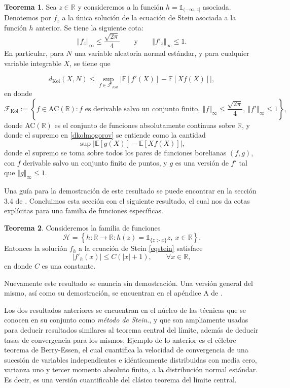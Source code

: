 \documentclass[letterpaper,twoside,12pt]{book}
\newcommand{\R}{\mathbb{R}}
\newcommand{\F}{\mathcal{F}}
\newcommand{\E}{\mathbb{E}}
\newcommand{\1}{\mathds{1}}
\newcommand{\abs}[1]{\left\lvert #1 \right\rvert}
\renewcommand{\to}{\rightarrow}
\newcommand{\norm}[1]{\left\Vert #1 \right\Vert}
\theoremstyle{definition}
\theoremstyle{definition}
\newtheorem{teo}{Teorema}
\theoremstyle{remark}
\theoremstyle{definition}
\theoremstyle{definition}
\theoremstyle{definition}
\theoremstyle{definition}
\theoremstyle{definition}
\begin{document}
 \begin{teo}\label{cotakolmogorovstein}
   Sea $z\in \R$ y consideremos a la función $h=\1_{(-\infty,z]}$ asociada. Denotemos por $f_z$ a la única solución de la ecuación de Stein asociada a la función $h$ anterior. Se tiene la siguiente cota:
  \[
      \norm{f_z}_{\infty}\leq \frac{\sqrt{2\pi}}{4} \qquad \text{y} \qquad \norm{f'_z}_\infty\leq 1.
  \]
En particular, para $N$ una variable aleatoria normal estándar, y para cualquier variable integrable $X$, se tiene que 

\begin{equation}\label{dkolmogorov}
      d_{\text{Kol}}(X,N)\leq \sup_{f\in \F_{Kol}}\abs{\E\left[f'(X)\right]-\E\left[Xf(X)\right]},
\end{equation}
en donde 
\[\F_{\text{Kol}}:=\left\{f \in \text{AC}(\R): f \text{ es derivable salvo un conjunto finito}, \  \norm{f}_\infty\leq \frac{\sqrt{2\pi}}{4}, \ \norm{f'}_\infty\leq 1\right\},\]
donde AC$(\R)$ es el conjunto de funciones absolutamente continuas sobre $\R$, y donde el supremo en \eqref{dkolmogorov} se entiende como la cantidad 
\[
\sup \abs{\E\left[g(X)\right]-\E\left[Xf(X)\right]},
\]
donde el supremo se toma sobre todos los pares de funciones borelianas $(f,g)$, con $f$ derivable salvo un conjunto finito de puntos, y $g$ es una versión de $f'$ tal que $\norm{g}_\infty\leq 1$.
\end{teo}

Una guía para la demostración de este resultado se puede encontrar en la sección 3.4 de \cite{Nourdin_Peccati_2012}. Concluimos esta sección con el siguiente resultado, el cual nos da cotas explícitas para una familia de funciones específicas.

\begin{teo}\label{metodosteinfamespecial}
 Consideremos la familia de funciones 
 \[
 \mathscr{H}=\left\{h:\R\to\R : h(z)=\1_{\{z>x\}}z, \ x\in \R\right\}.
 \] 
 Entonces la solución $f_h$ a la ecuación de Stein \eqref{eqstein} satisface 
 \[
 |f'_h(x)|\leq C(\abs{x}+1), \qquad \forall x\in \R,
 \]
 en donde $C$ es una constante.
 \end{teo}
Nuevamente este resultado se enuncia sin demostración. Una versión general del mismo, así como su demostración, se encuentran en el apéndice A de \cite{HU2014814}.

Los dos resultados anteriores se encuentran en el núcleo de las técnicas que se conocen en su conjunto como \textit{método de Stein.}, y que son ampliamente usadas para deducir resultados similares al teorema central del límite, además de deducir tasas de convergencia para los mismos. Ejemplo de lo anterior es el célebre teorema de Berry-Essen, el cual cuantifica la velocidad de convergencia de una sucesión de variables independientes e idénticamente distribuidas con media cero, varianza uno y tercer momento absoluto finito, a la distribución normal estándar. Es decir, es una versión cuantificable del clásico teorema del límite central.
\end{document}
